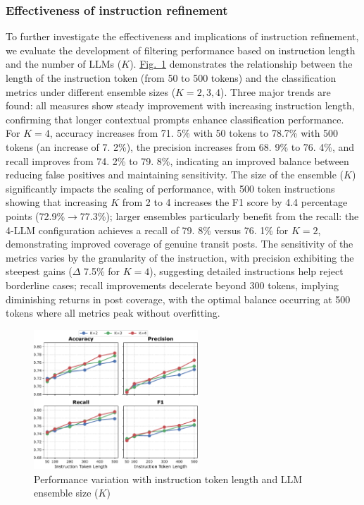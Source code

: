 \documentclass[a4paper,fleqn,12pt]{cas-sc}
\begin{document}
\subsubsection{Effectiveness of instruction refinement}

To further investigate the effectiveness and implications of instruction refinement, we evaluate the development of filtering performance based on instruction length and the number of LLMs (\(K\)). \hyperref[fig:instruction_length]{Fig.~\ref{fig:instruction_length}} demonstrates the relationship between the length of the instruction token (from 50 to 500 tokens) and the classification metrics under different ensemble sizes (\(K=2,3,4\)). Three major trends are found: all measures show steady improvement with increasing instruction length, confirming that longer contextual prompts enhance classification performance. For $K=4$, accuracy increases from 71. 5\% with 50 tokens to 78.7\% with 500 tokens (an increase of 7. 2\%), the precision increases from 68. 9\% to 76. 4\%, and recall improves from 74. 2\% to 79. 8\%, indicating an improved balance between reducing false positives and maintaining sensitivity. The size of the ensemble ($K$) significantly impacts the scaling of performance, with 500 token instructions showing that increasing $K$ from 2 to 4 increases the F1 score by 4.4 percentage points (72.9\%$\rightarrow$77.3\%); larger ensembles particularly benefit from the recall: the 4-LLM configuration achieves a recall of 79. 8\% versus 76. 1\% for $K=2$, demonstrating improved coverage of genuine transit posts. The sensitivity of the metrics varies by the granularity of the instruction, with precision exhibiting the steepest gains ($\Delta$ 7.5\% for $K=4$), suggesting detailed instructions help reject borderline cases; recall improvements decelerate beyond 300 tokens, implying diminishing returns in post coverage, with the optimal balance occurring at 500 tokens where all metrics peak without overfitting.

\begin{figure}[!ht]
\centering
\includegraphics[width=0.55\textwidth]{figs/instruction_length_performance.pdf}
\caption{Performance variation with instruction token length and LLM ensemble size (\(K\))}\label{fig:instruction_length}
\end{figure}
\end{document}
